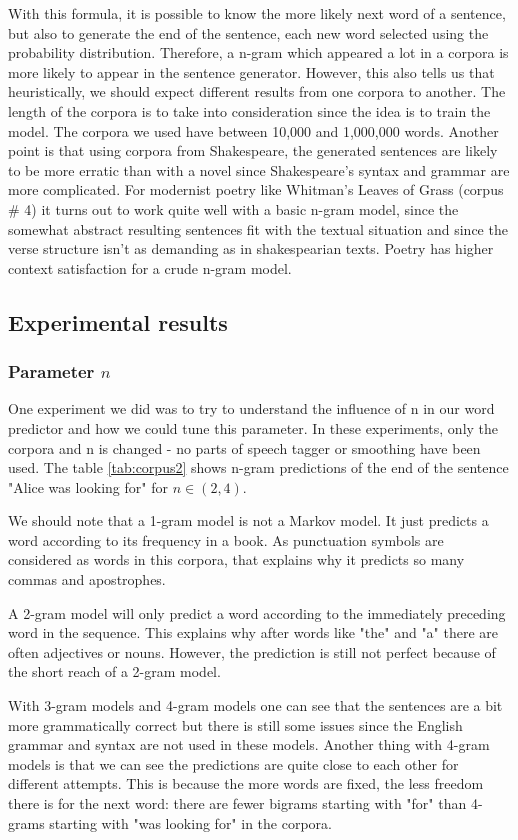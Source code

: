 \documentclass[a4paper,12pt]{article}
\begin{document}
With this formula, it is possible to know the more likely next word of a sentence, but also to generate the end of the sentence, each new word selected using the probability distribution. Therefore, a n-gram which appeared a lot in a corpora is more likely to appear in the sentence generator. However, this also tells us that heuristically, we should expect different results from one corpora to another. The length of the corpora is to take into consideration since the idea is to train the model. The corpora we used have between 10,000 and 1,000,000 words. Another point is that using corpora from Shakespeare, the generated sentences are likely to be more erratic than with a novel since Shakespeare's syntax and grammar are more complicated. For modernist poetry like Whitman's Leaves of Grass (corpus \# 4) it turns out to work quite well with a basic n-gram model, since the somewhat abstract resulting sentences fit with the textual situation and since the verse structure isn't as demanding as in shakespearian texts. Poetry has higher context satisfaction for a crude n-gram model.


\subsection{Experimental results}
\subsubsection{Parameter $n$}
	One experiment we did was to try to understand the influence of n in our word predictor and how we could tune this parameter. In these experiments, only the corpora and n is changed - no parts of speech tagger or smoothing have been used. The table \ref{tab:corpus2} shows n-gram predictions of the end of the sentence "Alice was looking for" for $ n\in(2,4) $.
	
We should note that a 1-gram model is not a Markov model. It just predicts a word according to its frequency in a book. As punctuation symbols are considered as words in this corpora, that explains why it predicts so many commas and apostrophes. 

A 2-gram model will only predict a word according to the immediately preceding word in the sequence. This explains why after words like "the" and "a" there are often adjectives or nouns. However, the prediction is still not perfect because of the short reach of a 2-gram model.

With 3-gram models and 4-gram models one can see that the sentences are a bit more grammatically correct but there is still some issues since the English grammar and syntax are not used in these models. Another thing with 4-gram models is that we can see the predictions are quite close to each other for different attempts. This is because the more words are fixed, the less freedom there is for the next word: there are fewer bigrams starting with "for" than 4-grams starting with "was looking for" in the corpora.
	
\end{document}
